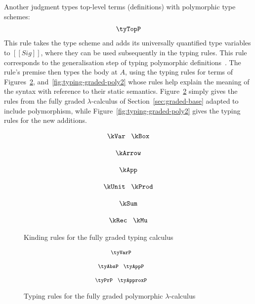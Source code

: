 Another judgment types top-level terms (definitions) with polymorphic type
schemes:
\begin{align*}
\tyTopP
\end{align*}
This rule takes the type scheme and adds its universally quantified type
variables to $[[ Sig ]]$, where they can be used subsequently in the typing
rules. This rule corresponds to the generalisation step of typing polymorphic
definitions~\citep{milner1978theory}. The rule's premise then types the body at
$A$, using the typing rules for terms of Figures~\ref{fig:typing-graded-poly1},
and~\ref{fig:typing-graded-poly2} whose rules help explain the meaning of the
syntax with reference to their static semantics. Figure~\ref{fig:typing-graded-poly1} 
simply gives the rules from the fully graded $\lambda$-calculus of Section~\ref{sec:graded-base}
adapted to include polymorphism, while Figure~\ref{fig:typing-graded-poly2} gives the
typing rules for the new additions.
\begin{figure}[t]
    \begin{align*}
      {{
    \hspace{0em}\begin{array}{c}
        \kVar 
        \;\;\;
        \kBox 
        \\[1.25em]
        \kArrow
        \\[1.25em]
        \kApp 
        \\[1.25em]
        \kUnit
        \;\;\;
        \kProd 
        \\[1.25em]
        \kSum
        \\[1.25em]
        \kRec
        \;\;\; 
        \kMu
    \end{array}
      }}
    \end{align*}
    \caption{Kinding rules for the fully graded typing calculus}
    \label{figure:kinding}
\end{figure}

\begin{figure}[t]
    \begin{align*}
    {\footnotesize{
    \hspace{-2.5em}
    \begin{array}{c}
    \tyVarP
    \\[1.25em]
    \tyAbsP
    \;\;\;
    \tyAppP
        \\[1.25em]
    \tyPrP
    \;\;\;
    \tyApproxP
    \end{array}
    }}
    \end{align*}
    \vspace{-1em}
    \caption{Typing rules for the fully graded polymorphic $\lambda$-calculus}
    \label{fig:typing-graded-poly1}
    \vspace{-0.5em}
\end{figure}

